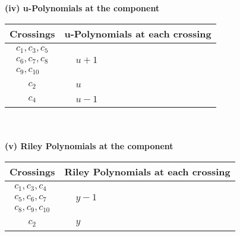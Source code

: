 \documentclass[1p]{elsarticle_modified}
\theoremstyle{definition}
\begin{document}
\newpage\renewcommand{\arraystretch}{1}
\flushleft \textbf{(iv) u-Polynomials at the component}\newline \\
\begin{tabular}{m{50pt}|m{274pt}}
Crossings & \hspace{64pt}u-Polynomials at each crossing \\
\hline $$\begin{aligned}c_{1},c_{3},c_{5}\\c_{6},c_{7},c_{8}\\c_{9},c_{10}\end{aligned}$$&$\begin{aligned}
&u+1
\end{aligned}$\\
\hline $$\begin{aligned}c_{2}\end{aligned}$$&$\begin{aligned}
&u
\end{aligned}$\\
\hline $$\begin{aligned}c_{4}\end{aligned}$$&$\begin{aligned}
&u-1
\end{aligned}$\\
\hline
\end{tabular}\\~\\
\newpage\renewcommand{\arraystretch}{1}
\flushleft \textbf{(v) Riley Polynomials at the component}\newline \\
\begin{tabular}{m{50pt}|m{274pt}}
Crossings & \hspace{64pt}Riley Polynomials at each crossing \\
\hline $$\begin{aligned}c_{1},c_{3},c_{4}\\c_{5},c_{6},c_{7}\\c_{8},c_{9},c_{10}\end{aligned}$$&$\begin{aligned}
&y-1
\end{aligned}$\\
\hline $$\begin{aligned}c_{2}\end{aligned}$$&$\begin{aligned}
&y
\end{aligned}$\\
\hline
\end{tabular}\\~\\
\end{document}
